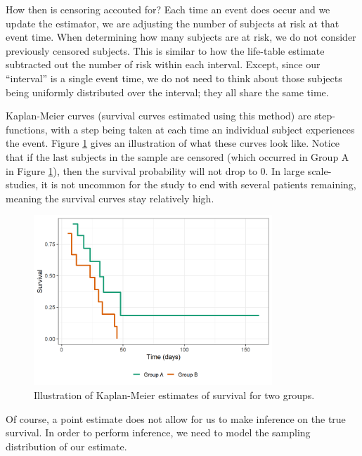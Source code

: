 \documentclass[
]{book}
\theoremstyle{plain}
\theoremstyle{mydefn}
\theoremstyle{myexmpl}
\theoremstyle{remark}
\begin{document}
How then is censoring accouted for? Each time an event does occur and we update the estimator, we are adjusting the number of subjects at risk at that event time. When determining how many subjects are at risk, we do not consider previously censored subjects. This is similar to how the life-table estimate subtracted out the number of risk within each interval. Except, since our ``interval'' is a single event time, we do not need to think about those subjects being uniformly distributed over the interval; they all share the same time.

Kaplan-Meier curves (survival curves estimated using this method) are step-functions, with a step being taken at each time an individual subject experiences the event. Figure \ref{fig:surv-km-curves} gives an illustration of what these curves look like. Notice that if the last subjects in the sample are censored (which occurred in Group A in Figure \ref{fig:surv-km-curves}), then the survival probability will not drop to 0. In large scale-studies, it is not uncommon for the study to end with several patients remaining, meaning the survival curves stay relatively high.

\begin{figure}

{\centering \includegraphics[width=0.8\textwidth]{./Images/surv-km-curves-1} 

}

\caption{Illustration of Kaplan-Meier estimates of survival for two groups.}\label{fig:surv-km-curves}
\end{figure}

Of course, a point estimate does not allow for us to make inference on the true survival. In order to perform inference, we need to model the sampling distribution of our estimate.
\end{document}
